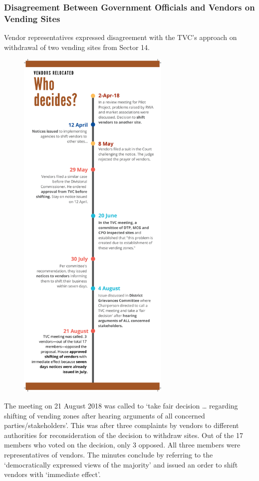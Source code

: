 \documentclass[a4paper, 12pt, twoside, table]{article}
\begin{document}
{{\subsubsection*{Disagreement Between Government Officials and Vendors on Vending Sites}

Vendor representatives expressed disagreement with the TVC’s approach on withdrawal of two vending sites from Sector 14.

\begin{figure}
\vspace{-10pt}
\hspace{-20pt}
\centering
\includegraphics[height=17.6cm]{WhoDecides.pdf}
\vspace{-40pt}
\end{figure}

The meeting on 21 August 2018 was called to `take fair decision … regarding shifting of vending zones after hearing arguments of all concerned parties/stakeholders'. This was after three complaints by vendors to different authorities for reconsideration of the decision to withdraw sites. Out of the 17 members who voted on the decision, only 3 opposed. All three members were representatives of vendors. The minutes conclude by referring to the `democratically expressed views of the majority' and issued an order to shift vendors with `immediate effect'.

}}
\end{document}
